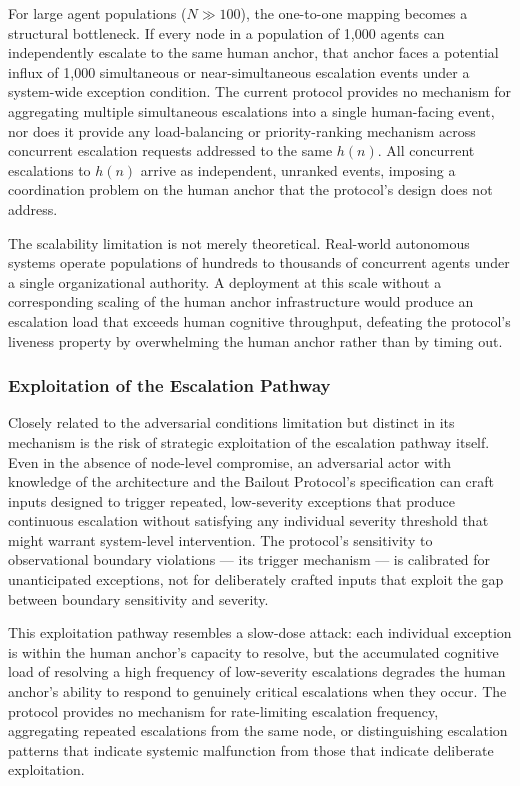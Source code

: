 For large agent populations ($N \gg 100$), the one-to-one mapping becomes a structural bottleneck. If every node in a population of 1,000 agents can independently escalate to the same human anchor, that anchor faces a potential influx of 1,000 simultaneous or near-simultaneous escalation events under a system-wide exception condition. The current protocol provides no mechanism for aggregating multiple simultaneous escalations into a single human-facing event, nor does it provide any load-balancing or priority-ranking mechanism across concurrent escalation requests addressed to the same $h(n)$. All concurrent escalations to $h(n)$ arrive as independent, unranked events, imposing a coordination problem on the human anchor that the protocol's design does not address.

The scalability limitation is not merely theoretical. Real-world autonomous systems operate populations of hundreds to thousands of concurrent agents under a single organizational authority. A \bxthree{} deployment at this scale without a corresponding scaling of the human anchor infrastructure would produce an escalation load that exceeds human cognitive throughput, defeating the protocol's liveness property by overwhelming the human anchor rather than by timing out.

\subsubsection{Exploitation of the Escalation Pathway}

Closely related to the adversarial conditions limitation but distinct in its mechanism is the risk of strategic exploitation of the escalation pathway itself. Even in the absence of node-level compromise, an adversarial actor with knowledge of the \bxthree{} architecture and the Bailout Protocol's specification can craft inputs designed to trigger repeated, low-severity exceptions that produce continuous escalation without satisfying any individual severity threshold that might warrant system-level intervention. The protocol's sensitivity to observational boundary violations --- its trigger mechanism --- is calibrated for unanticipated exceptions, not for deliberately crafted inputs that exploit the gap between boundary sensitivity and severity.

This exploitation pathway resembles a slow-dose attack: each individual exception is within the human anchor's capacity to resolve, but the accumulated cognitive load of resolving a high frequency of low-severity escalations degrades the human anchor's ability to respond to genuinely critical escalations when they occur. The protocol provides no mechanism for rate-limiting escalation frequency, aggregating repeated escalations from the same node, or distinguishing escalation patterns that indicate systemic malfunction from those that indicate deliberate exploitation.

